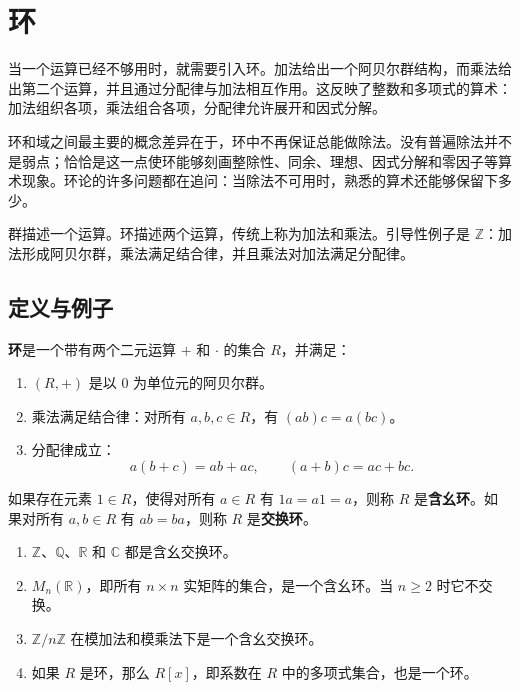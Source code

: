 \section{环}


当一个运算已经不够用时，就需要引入环。加法给出一个阿贝尔群结构，而乘法给出第二个运算，并且通过分配律与加法相互作用。这反映了整数和多项式的算术：加法组织各项，乘法组合各项，分配律允许展开和因式分解。

环和域之间最主要的概念差异在于，环中不再保证总能做除法。没有普遍除法并不是弱点；恰恰是这一点使环能够刻画整除性、同余、理想、因式分解和零因子等算术现象。环论的许多问题都在追问：当除法不可用时，熟悉的算术还能够保留下多少。

群描述一个运算。环描述两个运算，传统上称为加法和乘法。引导性例子是 $\mathbb{Z}$：加法形成阿贝尔群，乘法满足结合律，并且乘法对加法满足分配律。

\subsection{定义与例子}

\begin{definition}[环]
\textbf{环}是一个带有两个二元运算 $+$ 和 $\cdot$ 的集合 $R$，并满足：
\begin{enumerate}
    \item $(R,+)$ 是以 $0$ 为单位元的阿贝尔群。
    \item 乘法满足结合律：对所有 $a,b,c\in R$，有 $(ab)c=a(bc)$。
    \item 分配律成立：
    \[
        a(b+c)=ab+ac,
        \qquad
        (a+b)c=ac+bc.
    \]
\end{enumerate}
如果存在元素 $1\in R$，使得对所有 $a\in R$ 有 $1a=a1=a$，则称 $R$ 是\textbf{含幺环}。如果对所有 $a,b\in R$ 有 $ab=ba$，则称 $R$ 是\textbf{交换环}。
\end{definition}

\begin{example}[基本环]
\begin{enumerate}
    \item $\mathbb{Z}$、$\mathbb{Q}$、$\mathbb{R}$ 和 $\mathbb{C}$ 都是含幺交换环。
    \item $M_n(\mathbb{R})$，即所有 $n\times n$ 实矩阵的集合，是一个含幺环。当 $n\geq 2$ 时它不交换。
    \item $\mathbb{Z}/n\mathbb{Z}$ 在模加法和模乘法下是一个含幺交换环。
    \item 如果 $R$ 是环，那么 $R[x]$，即系数在 $R$ 中的多项式集合，也是一个环。
\end{enumerate}
\end{example}

